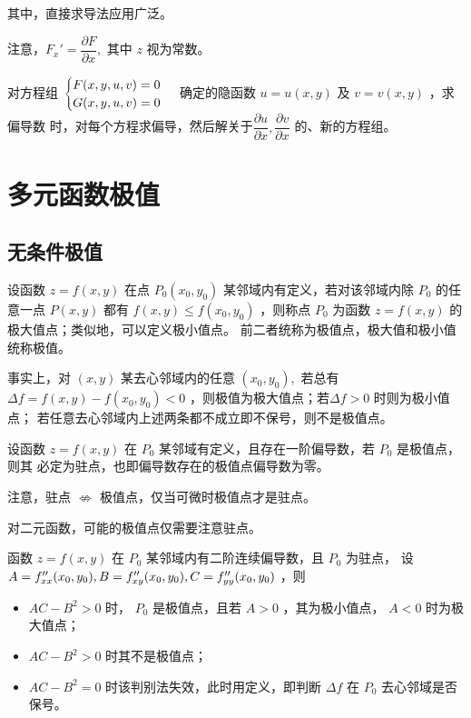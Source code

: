 其中，直接求导法应用广泛。

注意，$ F_x' = \dfrac{\partial F}{\partial x}, $ 其中 $ z $ 视为常数。

对方程组 $ \displaystyle \begin{cases}
    F(x,y,u,v) = 0 \\ G(x,y,u,v) = 0
\end{cases} $ 确定的隐函数 $ u = u(x,y) $ 及 $ v = v(x,y) $ ，求偏导数
时，对每个方程求偏导，然后解关于$ \dfrac{\partial u}{\partial x},\dfrac{\partial v}{\partial x} $ 的、新的方程组。


\section{多元函数极值}

\subsection{无条件极值}

\begin{Def}[无条件极值]
    
    设函数 $ z = f(x,y) $ 在点 $ P_0(x_0,y_0) $ 某邻域内有定义，若对该邻域内除 $ P_0 $ 的任意一点 $ P(x,y) $ 
    都有 $ f(x,y)\leq f(x_0,y_0) $ ，则称点 $ P_0 $ 为函数 $ z = f(x,y) $ 的极大值点；类似地，可以定义极小值点。
    前二者统称为极值点，极大值和极小值统称极值。
\end{Def}

事实上，对 $ (x,y) $ 某去心邻域内的任意 $ (x_0,y_0), $ 
若总有 $ \Delta f = f(x,y) - f(x_0,y_0) < 0 $ ，则极值为极大值点；若$ \Delta f > 0 $ 时则为极小值点；
若任意去心邻域内上述两条都不成立即不保号，则不是极值点。
    
\begin{Theo}[二元函数极值存在的必要条件]

    设函数 $ z = f(x,y) $ 在 $ P_0 $ 某邻域有定义，且存在一阶偏导数，若 $ P_0 $ 是极值点，则其
    必定为驻点，也即偏导数存在的极值点偏导数为零。
\end{Theo}

注意，驻点 $ \nLeftrightarrow $ 极值点，仅当可微时极值点才是驻点。

对二元函数，可能的极值点仅需要注意驻点。

\begin{Theo}[二元函数极值存在的充分条件]

    函数 $ z = f(x,y) $ 在 $ P_0 $ 某邻域内有二阶连续偏导数，且 $ P_0 $ 为驻点，
    设 $ A = f^{\prime\prime}_{xx}(x_0,y_0),B = f^{\prime\prime}_{xy}(x_0,y_0),C = f^{\prime\prime}_{yy}(x_0,y_0) $ ，则
    \begin{itemize}
        \item $ AC - B^2 > 0 $ 时， $ P_0 $ 是极值点，且若 $ A>0 $ ，其为极小值点，
        $ A<0 $ 时为极大值点；
        \item $ AC-B^2>0 $ 时其不是极值点；
        \item $ AC-B^2 = 0 $ 时该判别法失效，此时用定义，即判断 $ \Delta f $ 在
        $ P_0 $ 去心邻域是否保号。
    \end{itemize}
\end{Theo}


